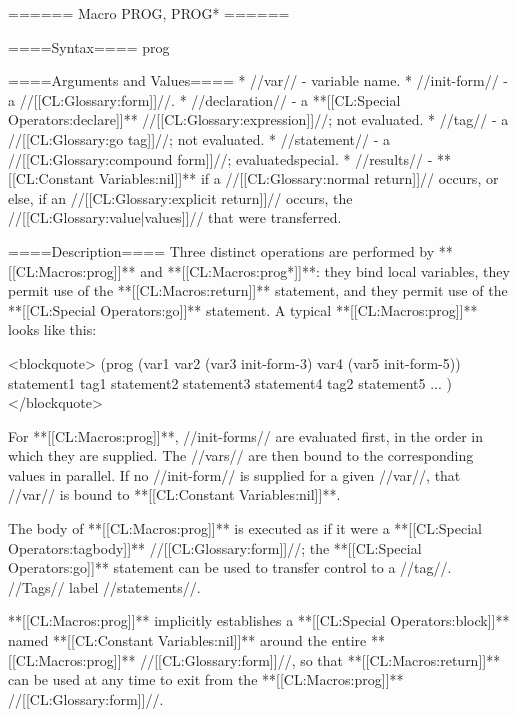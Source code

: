 ====== Macro PROG, PROG* ======

====Syntax====
\DefmacWithValuesNewline prog {  } {}

 {  } {}

====Arguments and Values====
  * //var// - variable name.
  * //init-form// - a //[[CL:Glossary:form]]//.
  * //declaration// - a **[[CL:Special Operators:declare]]** //[[CL:Glossary:expression]]//; not evaluated.
  * //tag// - a //[[CL:Glossary:go tag]]//; not evaluated.
  * //statement// - a //[[CL:Glossary:compound form]]//; evaluatedspecial.
  * //results// - **[[CL:Constant Variables:nil]]** if a //[[CL:Glossary:normal return]]// occurs, or else, if an //[[CL:Glossary:explicit return]]// occurs, the //[[CL:Glossary:value|values]]// that were transferred.

====Description====
Three distinct operations are performed by **[[CL:Macros:prog]]** and **[[CL:Macros:prog*]]**: they bind local variables, they permit use of the **[[CL:Macros:return]]** statement, and they permit use of the **[[CL:Special Operators:go]]** statement. A typical **[[CL:Macros:prog]]** looks like this:

<blockquote> (prog (var1 var2 (var3 init-form-3) var4 (var5 init-form-5))  statement1 tag1 statement2 statement3 statement4 tag2 statement5 ... ) </blockquote>

For **[[CL:Macros:prog]]**, //init-forms// are evaluated first, in the order in which they are supplied. The //vars// are then bound to the corresponding values in parallel. If no //init-form// is supplied for a given //var//, that //var// is bound to **[[CL:Constant Variables:nil]]**.

The body of **[[CL:Macros:prog]]** is executed as if it were a **[[CL:Special Operators:tagbody]]** //[[CL:Glossary:form]]//; the **[[CL:Special Operators:go]]** statement can be used to transfer control to a //tag//. //Tags// label //statements//.

**[[CL:Macros:prog]]** implicitly establishes a **[[CL:Special Operators:block]]** named **[[CL:Constant Variables:nil]]** around the entire **[[CL:Macros:prog]]** //[[CL:Glossary:form]]//, so that **[[CL:Macros:return]]** can be used at any time to exit from the **[[CL:Macros:prog]]** //[[CL:Glossary:form]]//.

